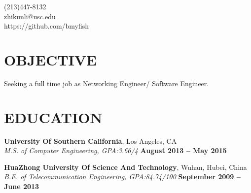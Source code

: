 \documentclass[margin,line]{resume}
\begin{document}
{
	\sc
    \hfill (213)447-8132                  		  \vspace{0mm}\\\vspace{0mm}%
    \hfill zhikunli@usc.edu            		      \vspace{0mm}\\\vspace{0mm}%
    \hfill https://github.com/bmyfish             \vspace{0mm}\\\vspace{-10mm}%
}
\vspace{1mm}

\begin{resume}

\vspace{1mm}
	\section{\mysidestyle \textbf{\large{O}\small{BJECTIVE}}}
	Seeking a full time job as Networking Engineer/ Software Engineer.
	\sectionline

    \section{\mysidestyle \textbf{\large{E}\small{DUCATION}}}
    \textbf{\listing University Of Southern California}, Los Angeles, CA \vspace{2mm}\\\vspace{1mm}%
    \textsl{M.S. of Computer Engineering, GPA:3.66/4} \hfill \textbf{August 2013 -- May 2015}\vspace{-3mm}\\\vspace{-1mm}%

    \textbf{\listing HuaZhong University Of Science And Technology}, Wuhan, Hubei, China \vspace{2mm}\\\vspace{1mm}%
    \textsl{B.E. of Telecommunication Engineering, GPA:84.74/100} \hfill \textbf{September 2009 -- June 2013}\vspace{-3mm}\\\vspace{-1mm}%



\end{resume}
\end{document}
